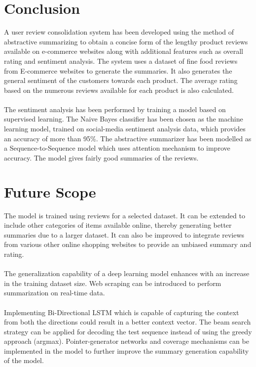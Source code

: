 \documentclass[11pt]{report}
\begin{document}
\chapter{Conclusion}
A user review consolidation system has been developed using the method of abstractive summarizing to obtain a concise form of the lengthy product reviews available on e-commerce websites along with additional features such as overall rating and sentiment analysis. The system uses a dataset of fine food reviews from E-commerce websites to generate the summaries. It also generates the general sentiment of the customers towards each product. The average rating based on the numerous reviews available for each product is also calculated.\\ \\
The sentiment analysis has been performed by training a model based on supervised learning. The Naive Bayes classifier has been chosen as the machine learning model, trained on social-media sentiment analysis data, which provides an accuracy of more than 95\%. The abstractive summarizer has been modelled as a Sequence-to-Sequence model which uses attention mechanism to improve accuracy. The model gives fairly good summaries of the reviews. 

\chapter{Future Scope}
The model is trained using reviews for a selected dataset. It can be extended to include other categories of items available online, thereby generating better summaries due to a larger dataset. It can also be improved to integrate reviews from various other online shopping websites to provide an unbiased summary and rating.\\ \\
The generalization capability of a deep learning model enhances with an increase in the training dataset size. Web scraping can be introduced to perform summarization on real-time data.\\ \\
Implementing Bi-Directional LSTM which is capable of capturing the context from both the directions could result in a better context vector. The beam search strategy can be applied for decoding the test sequence instead of using the greedy approach (argmax). Pointer-generator networks and coverage mechanisms can be implemented in the model to further improve the summary generation capability of the model.
\end{document}
